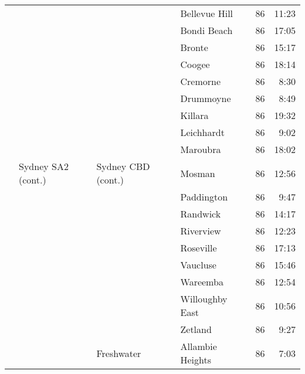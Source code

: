 \documentclass{grattan}
\begin{document}
\begin{longtable}{Nlllrr}
 &                                &                       & Bellevue Hill        & 86  & 11:23 \\
 &                                &                       & Bondi Beach          & 86  & 17:05 \\
 &                                &                       & Bronte               & 86  & 15:17 \\
 &                                &                       & Coogee               & 86  & 18:14 \\
 &                                &                       & Cremorne             & 86  & 8:30 \\
 &                                &                       & Drummoyne            & 86  & 8:49 \\
 &                                &                       & Killara              & 86  & 19:32 \\
 &                                &                       & Leichhardt           & 86  & 9:02 \\
 &                                &                       & Maroubra             & 86  & 18:02 \\
 & Sydney SA2 (cont.)             & Sydney CBD (cont.)    & Mosman               & 86  & 12:56 \\
 &                                &                       & Paddington           & 86  & 9:47 \\
 &                                &                       & Randwick             & 86  & 14:17 \\
 &                                &                       & Riverview            & 86  & 12:23 \\
 &                                &                       & Roseville            & 86  & 17:13 \\
 &                                &                       & Vaucluse             & 86  & 15:46 \\
 &                                &                       & Wareemba             & 86  & 12:54 \\
 &                                &                       & Willoughby East      & 86  & 10:56 \\
 &                                &                       & Zetland              & 86  & 9:27 \\
 &                                & Freshwater            & Allambie Heights     & 86  & 7:03 \\

\end{longtable}
\end{document}
